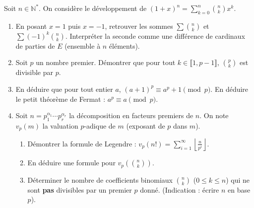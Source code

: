 \documentclass[11pt]{article}
\begin{document}
\begin{exercice}
Soit $n \in \mathbb{N}^*$. On considère le développement de $(1+x)^n = \sum_{k=0}^{n} \binom{n}{k}x^k$.
\begin{enumerate}
    \item En posant $x=1$ puis $x=-1$, retrouver les sommes $\sum \binom{n}{k}$ et $\sum (-1)^k\binom{n}{k}$. Interpréter la seconde comme une différence de cardinaux de parties de $E$ (ensemble à $n$ éléments).
    \item Soit $p$ un nombre premier. Démontrer que pour tout $k \in \llbracket 1, p-1 \rrbracket$, $\binom{p}{k}$ est divisible par $p$.
    \item En déduire que pour tout entier $a$, $(a+1)^p \equiv a^p + 1 \pmod{p}$. En déduire le petit théorème de Fermat : $a^p \equiv a \pmod{p}$.
    \item Soit $n = p_1^{\alpha_1} \cdots p_r^{\alpha_r}$ la décomposition en facteurs premiers de $n$. On note $v_p(m)$ la valuation $p$-adique de $m$ (exposant de $p$ dans $m$). 
    \begin{enumerate}
        \item Démontrer la formule de Legendre : $v_p(n!) = \sum_{i=1}^{\infty} \left\lfloor \frac{n}{p^i} \right\rfloor$.
        \item En déduire une formule pour $v_p\left(\binom{n}{k}\right)$.
        \item Déterminer le nombre de coefficients binomiaux $\binom{n}{k}$ ($0 \le k \le n$) qui ne sont \textbf{pas} divisibles par un premier $p$ donné. (Indication : écrire $n$ en base $p$).
    \end{enumerate}
\end{enumerate}
\end{exercice}
\end{document}
